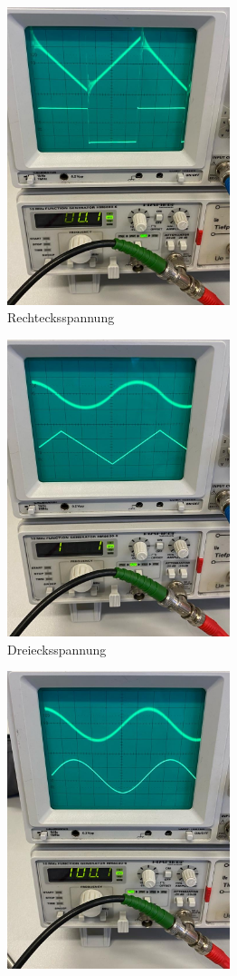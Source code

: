 \begin{figure}[H]
    \begin{subfigure}{0.5\textwidth}
        \centering
        \includegraphics[width=6.5cm]{./content/Rechtecksspannung.jpg}
        \caption{Rechtecksspannung}
        \label{fig:Rechteck}
    \end{subfigure}
    \begin{subfigure}{0.5\textwidth}
        \centering
        \includegraphics[width=6.5cm]{./content/Dreiecksspannung.jpg}
        \caption{Dreiecksspannung}
        \label{fig:Rechteck}
    \end{subfigure}
    \begin{subfigure}{0.5\textwidth}
        \centering
        \includegraphics[width=6.5cm]{./content/Sinusspannung.jpg}

\end{subfigure}
\end{figure}

